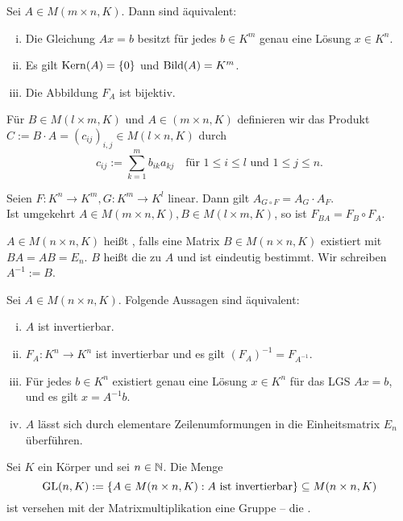 \begin{korollar}
	\label{folg:I.6.9}
	Sei $A \in M(m\times n,K)$.
	Dann sind äquivalent:
	\begin{enumerate}[(i)]
		\item Die Gleichung $Ax=b$ besitzt für jedes $b \in K^m$ genau eine Lösung $x \in K^n$.
		\item Es gilt $\operatorname{Kern}(A) = \{0\}$ und $\operatorname{Bild}(A) = K^m$.
		\item Die Abbildung $F_A$ ist bijektiv.
	\end{enumerate}
\end{korollar}

\setcounter{satz}{12}
\begin{definition}[Matrixmultiplikation]
	\label{def:I.6.13}
	Für $B \in M(l \times m,K)$ und $A \in (m \times n,K)$ definieren wir das Produkt $C := B \cdot A = (c_{ij})_{i,j} \in M(l \times n,K)$ durch 
	\[
		c_{ij} := \sum_{k=1}^{m} b_{ik}a_{kj} \quad \text{für } 1 \leq i \leq l \text{ und } 1 \leq j \leq n.
	\]
\end{definition}

\begin{satz}
	\label{satz:I.6.14}
	Seien $F \colon K^n \rightarrow K^m, G \colon K^m \rightarrow K^l$ linear.
	Dann gilt $A_{G \circ F} = A_G \cdot A_F$. \\
	Ist umgekehrt $A \in M(m \times n,K), B \in M(l \times m,K)$, so ist $F_{BA} = F_B \circ F_A$.
\end{satz}

\setcounter{satz}{16}
\begin{definition}
	\label{def:I.6.17}
	$A \in M(n \times n,K)$ heißt , falls eine Matrix $B \in M(n\times n,K)$ existiert mit $BA = AB = E_n$.
	$B$ heißt die zu $A$  und ist eindeutig bestimmt.
	Wir schreiben $A^{-1} := B$.
\end{definition}

\setcounter{satz}{18}
\begin{satz}
	\label{satz:I.6.19}
	Sei $A \in M(n \times n,K)$.
	Folgende Aussagen sind äquivalent:
	\begin{enumerate}[(i)]
		\item $A$ ist invertierbar.
		\item $F_A\colon K^n \rightarrow K^n$ ist invertierbar und es gilt $(F_A)^{-1} = F_{A^{-1}}$.
		\item Für jedes $b \in K^n$ existiert genau eine Lösung $x \in K^n$ für das LGS $Ax = b$, und es gilt $x = A^{-1}b$.
		\item $A$ lässt sich durch elementare Zeilenumformungen in die Einheitsmatrix $E_n$ überführen.
	\end{enumerate}
\end{satz}

\setcounter{satz}{21}
\begin{definition}
	\label{def:I.6.22}
	Sei $K$ ein Körper und sei $n \in \mathbb{N}$.
	Die Menge
	\[
		\operatorname{GL}(n,K) := \{A \in M(n\times n,K) : A \text{ ist invertierbar}\} \subseteq M(n\times n,K)
	\]
	ist versehen mit der Matrixmultiplikation eine Gruppe -- die .
\end{definition}
\cleardoubleoddemptypage